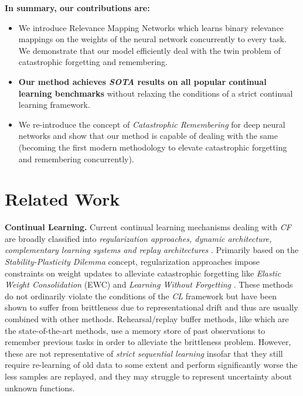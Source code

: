 \documentclass{article}
\begin{document}
\textbf{In summary, our contributions are:}
\begin{itemize}[topsep=0pt,itemsep=.5ex,partopsep=1ex,parsep=1ex]
    \item We introduce Relevance Mapping Networks which learns binary relevance mappings on the weights of the neural network concurrently to every task. We demonstrate that our model efficiently deal with the twin problem of catastrophic forgetting and remembering.
\item \textbf{Our method achieves \textit{SOTA} results on all popular continual learning benchmarks} without relaxing the conditions of a strict continual learning framework.
    \item We re-introduce the concept of \textit{Catastrophic Remembering} for deep neural networks and show that our method is capable of dealing with the same (becoming the first modern methodology to elevate catastrophic forgetting and remembering concurrently). 
\end{itemize}

\section{Related Work}\label{sec:related}

\textbf{Continual Learning.} Current continual learning mechanisms dealing with \textit{CF} are broadly classified into \textit{regularization approaches, dynamic architecture, complementary learning systems and replay architectures} \cite{parisi2018continual}. Primarily based on the \textit{Stability-Plasticity Dilemma} \cite{merm13} concept, regularization approaches impose constraints on weight updates to alleviate catastrophic forgetting like \textit{Elastic Weight Consolidation} (EWC) \cite{kirkpatrick2017overcoming} and \textit{Learning Without Forgetting} \cite{Li_2018}. These methods do not ordinarily violate the conditions of the \textit{CL} framework but have been shown to suffer from brittleness due to representational drift \cite{titsias2019functional, kemker2017measuring} and thus are usually combined with other methods. Rehearsal/replay buffer methods, like \cite{titsias2019functional} which are the state-of-the-art methods, use a memory store of past observations to remember previous tasks in order to alleviate the brittleness problem. However, these are not representative of \textit{strict sequential learning} insofar that they still require re-learning of old data to some extent and perform significantly worse the less samples are replayed, and they may struggle to represent uncertainty about unknown functions.
\end{document}
